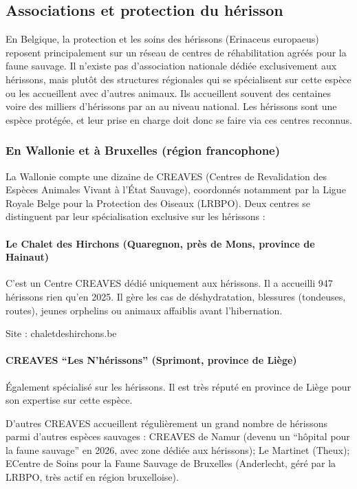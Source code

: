 \documentclass[a4paper,11pt]{article}
\begin{document}
\subsection{Associations et protection du hérisson}

En Belgique, la protection et les soins des hérissons (Erinaceus europaeus) reposent principalement sur un réseau de centres de réhabilitation agréés pour la faune sauvage. Il n'existe pas d'association nationale dédiée exclusivement aux hérissons, mais plutôt des structures régionales qui se spécialisent sur cette espèce ou les accueillent avec d’autres animaux. Ils accueillent souvent des centaines voire des milliers d’hérissons par an au niveau national. Les hérissons sont une espèce protégée, et leur prise en charge doit donc se faire via ces centres reconnus.

\subsubsection{En Wallonie et à Bruxelles (région francophone)}

La Wallonie compte une dizaine de CREAVES (Centres de Revalidation des Espèces Animales Vivant à l’État Sauvage), coordonnés notamment par la Ligue Royale Belge pour la Protection des Oiseaux (LRBPO). Deux centres se distinguent par leur spécialisation exclusive sur les hérissons :

\paragraph{Le Chalet des Hirchons (Quaregnon, près de Mons, province de Hainaut)}

C’est un Centre CREAVES dédié uniquement aux hérissons. Il a accueilli 947 hérissons rien qu'en 2025. Il gère les cas de déshydratation, blessures (tondeuses, routes), jeunes orphelins ou animaux affaiblis avant l'hibernation.

Site : chaletdeshirchons.be

\paragraph{CREAVES \enquote{Les N’hérissons} (Sprimont, province de Liège)}

Également spécialisé sur les hérissons. Il est très réputé en province de Liège pour son expertise sur cette espèce.

D'autres CREAVES accueillent régulièrement un grand nombre de hérissons parmi d'autres espèces sauvages : CREAVES de Namur (devenu un \enquote{hôpital pour la faune sauvage} en 2026, avec zone dédiée aux hérissons); Le Martinet (Theux); ECentre de Soins pour la Faune Sauvage de Bruxelles (Anderlecht, géré par la LRBPO, très actif en région bruxelloise).
\end{document}
